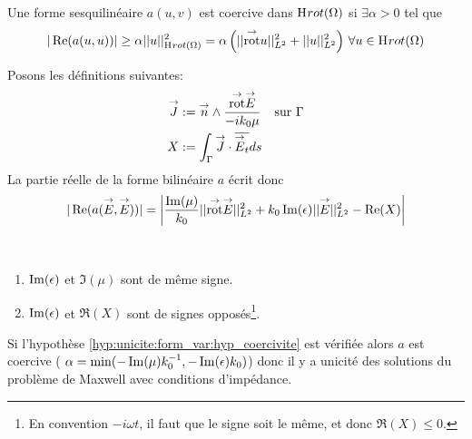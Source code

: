  \begin{defn}[Coercivité]
 Une forme sesquilinéaire $a(u,v)$ est coercive dans $\mathrm{H}_\mathrm{{}}{rot}(\Omega)$ si $\exists \alpha > 0$ tel que 
 \[
 |\operatorname{Re}(a(u,u))| \ge \alpha ||u||_{\mathrm{H}_\mathrm{{}}{rot}(\Omega)}^2 = \alpha \left( || {{\overset{\rightarrow}{\operatorname{rot}}}} u ||_{L^2}^2 + || u ||_{L^2}^2\right) \, \forall u \in \mathrm{H}_\mathrm{{}}{rot}(\Omega)
 \]
 \end{defn}


Posons les définitions suivantes:
\begin{align*}
{\overset{\rightarrow}{J}} &:=  {\overset{\rightarrow}{n}} \wedge \dfrac{{{\overset{\rightarrow}{\operatorname{rot}}}} {\overset{\rightarrow}{E}}}{-ik_0\mu} && \text{sur $\Gamma$}
\\X&:= \int_\Gamma {\overset{\rightarrow}{J}} \cdot {\overline{{\overset{\rightarrow}{E}}_t}} ds
\end{align*}
La partie réelle de la forme bilinéaire $a$ écrit donc
\begin{equation}
\label{eq:unicite:form_var:decomp_form_bilin_1}
|\operatorname{Re}(a({\overset{\rightarrow}{E}},{\overset{\rightarrow}{E}}))| = \left|\dfrac{\operatorname{Im}(\mu)}{k_0} || {{\overset{\rightarrow}{\operatorname{rot}}}} {\overset{\rightarrow}{E}} ||_{L^2}^2  + k_0 \operatorname{Im}(\epsilon) || {\overset{\rightarrow}{E}} ||_{L^2}^2
- \operatorname{Re}(X)\right|
\end{equation}

\begin{hyp}\label{hyp:unicite:form_var:hyp_coercivite}
~{}

\begin{enumerate}
  \item $\operatorname{Im}(\epsilon)$ et $\Im(\mu)$ sont de même signe.
  \item $\operatorname{Im}(\epsilon)$ et $\Re(X)$ sont de signes opposés\footnote{En convention $-i\omega t$, il faut que le signe soit le même, et donc $\Re(X) \le 0$.}.
\end{enumerate}
\end{hyp}
Si l'hypothèse \ref{hyp:unicite:form_var:hyp_coercivite} est vérifiée alors $a$ est coercive ( $\alpha = \min(-\operatorname{Im}(\mu)k_0^{-1},-\operatorname{Im}(\epsilon)k_0)$) donc il y a unicité des solutions du problème de Maxwell avec conditions d'impédance.

